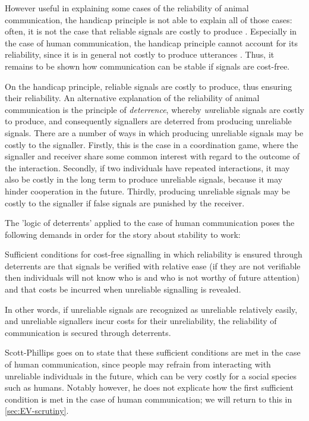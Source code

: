 However useful in explaining some cases of the reliability of animal communication, the handicap principle is not able to explain all of those cases: often, it is not the case that reliable signals are costly to produce \citep{Scott-Phillips08} . Especially in the case of human communication, the handicap principle cannot account for its reliability, since it is in general not costly to produce utterances \citep{Scott-Phillips08}.
Thus, it remains to be shown how communication can be stable if signals are cost-free.

On the handicap principle, reliable signals are costly to produce, thus ensuring their reliability. An alternative explanation of the reliability of animal communication is the principle of \emph{deterrence}, whereby \emph{un}reliable signals are costly to produce, and consequently signallers are deterred from producing unreliable signals.
There are a number of ways in which producing unreliable signals may be costly to the signaller. Firstly, this is the case in a coordination game, where the signaller and receiver share some common interest with regard to the outcome of the interaction.
Secondly, if two individuals have repeated interactions, it may also be costly in the long term to produce unreliable signals, because it may hinder cooperation in the future.
Thirdly, producing unreliable signals may be costly to the signaller if false signals are punished by the receiver.

The 'logic of deterrents' applied to the case of human communication poses the following demands in order for the story about stability to work:
\begin{quoting}
    Sufficient conditions for cost-free signalling in which reliability is ensured through deterrents are that signals be verified with relative ease (if they are not verifiable then individuals will not know who is and who is not worthy of future attention) and that costs be incurred when unreliable signalling is revealed.
    \hfill \citep[p.~?]{Scott-Phillips08}
\end{quoting}
In other words, if unreliable signals are recognized as unreliable relatively easily, and unreliable signallers incur costs for their unreliability, the reliability of communication is secured through deterrents.

Scott-Phillips goes on to state that these sufficient conditions are met in the case of human communication, since people may refrain from interacting with unreliable individuals in the future, which can be very costly for a social species such as humans.
Notably however, he does not explicate how the first sufficient condition is met in the case of human communication; we will return to this in \cref{sec:EV-scrutiny}.

